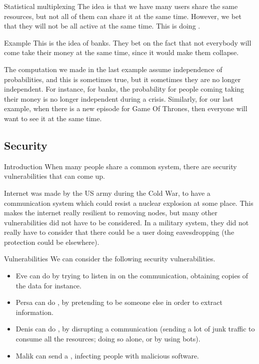 \documentclass[a4paper]{article}
\begin{document}
\begin{parag}{Statistical multiplexing}
    The idea is that we have many users share the same resources, but not all of them can share it at the same time. However, we bet that they will not be all active at the same time. This is doing .

    \begin{subparag}{Example}
        This is the idea of banks. They bet on the fact that not everybody will come take their money at the same time, since it would make them collapse.

        The computation we made in the last example assume independence of probabilities, and this is sometimes true, but it sometimes they are no longer independent. For instance, for banks, the probability for people coming taking their money is no longer independent during a crisis. Similarly, for our last example, when there is a new episode for Game Of Thrones, then everyone will want to see it at the same time.
    \end{subparag}
\end{parag}

\subsection{Security}
\begin{parag}{Introduction}
    When many people share a common system, there are security vulnerabilities that can come up.

    Internet was made by the US army during the Cold War, to have a communication system which could resist a nuclear explosion at some place. This makes the internet really resilient to removing nodes, but many other vulnerabilities did not have to be considered. In a military system, they did not really have to consider that there could be a user doing eavesdropping (the protection could be elsewhere).
\end{parag}

\begin{parag}{Vulnerabilities}
    We can consider the following security vulnerabilities.

    \begin{itemize}
        \item Eve can do  by trying to listen in on the communication, obtaining copies of the data for instance.
        \item Persa can do , by pretending to be someone else in order to extract information.
        \item Denis can do , by disrupting a communication (sending a lot of junk traffic to consume all the resources; doing so alone, or by using bots).
        \item Malik can send a , infecting people with malicious software.
    \end{itemize}
\end{parag}
\end{document}
